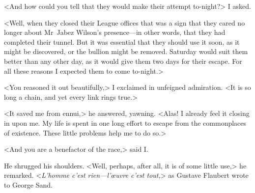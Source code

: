 <And how could you tell that they would make their attempt to-night?> I asked.

<Well, when they closed their League offices that was a sign that they cared no longer about Mr~Jabez Wilson's presence—in other words, that they had completed their tunnel. But it was essential that they should use it soon, as it might be discovered, or the bullion might be removed. Saturday would suit them better than any other day, as it would give them two days for their escape. For all these reasons I expected them to come to-night.>

<You reasoned it out beautifully,> I exclaimed in unfeigned admiration. <It is so long a chain, and yet every link rings true.>

<It saved me from ennui,> he answered, yawning. <Alas! I already feel it closing in upon me. My life is spent in one long effort to escape from the commonplaces of existence. These little problems help me to do so.>

<And you are a benefactor of the race,> said I\@.

He shrugged his shoulders. <Well, perhaps, after all, it is of some little use,> he remarked. <\textfrench{\textit{L'homme c'est rien—l'œuvre c'est tout,}}> as Gustave Flaubert wrote to George Sand.



